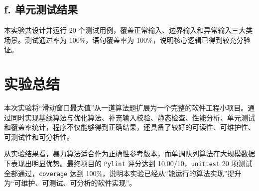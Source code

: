 \documentclass[UTF8,a4paper,12pt]{ctexart}
\begin{document}
\subsection{f. 单元测试结果}
本实验共设计并运行 20 个测试用例，覆盖正常输入、边界输入和异常输入三大类场景。测试通过率为 100\%，语句覆盖率为 100\%，说明核心逻辑已得到较充分验证。

\section{实验总结}
本次实验将“滑动窗口最大值”从一道算法题扩展为一个完整的软件工程小项目。通过同时实现基线算法与优化算法、补充输入校验、静态检查、性能分析、单元测试和覆盖率统计，程序不仅能够得到正确结果，还具备了较好的可读性、可维护性、可测试性和可分析性。

从实验结果看，暴力算法适合作为正确性参考版本，而单调队列算法在大规模数据下表现出明显优势。最终项目的 \texttt{Pylint} 评分达到 10.00/10，\texttt{unittest} 20 项测试全部通过，\texttt{coverage} 达到 100\%，说明本实验已经从“能运行的算法实现”提升为“可维护、可测试、可分析的软件实现”。
\end{document}
